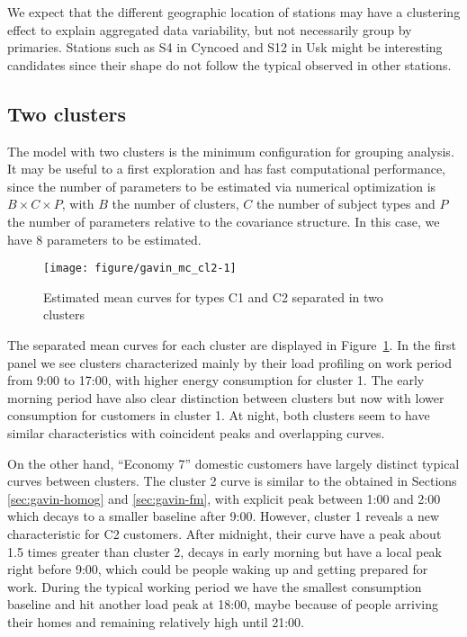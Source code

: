 We expect that the different geographic location of stations may have a clustering effect to explain aggregated data variability, but not necessarily group by primaries. Stations such as S4 in Cyncoed and S12 in Usk might be interesting candidates since their shape do not follow the typical observed in other stations.


\subsection{Two clusters}
\label{sec:gavin-2cl}





The model with two clusters is the minimum configuration for grouping analysis. It may be useful to a first exploration and has fast computational performance, since the number of parameters to be estimated via numerical optimization is $B \times C \times P$, with $B$ the number of clusters, $C$ the number of subject types and $P$ the number of parameters relative to the covariance structure. In this case, we have 8 parameters to be estimated.



\begin{figure}[t]
  \centering
\begin{knitrout}
\color{fgcolor}
\texttt{[image: figure/gavin\_mc\_cl2-1]} 

\end{knitrout}
  \caption{Estimated mean curves for types C1 and C2 separated in two clusters}
  \label{fig:gavin-cl2-mc}
\end{figure}

The separated mean curves for each cluster are displayed in Figure~\ref{fig:gavin-cl2-mc}. In the first panel we see clusters characterized mainly by their load profiling on work period from 9:00 to 17:00, with higher energy consumption for cluster 1. The early morning period have also clear distinction between clusters but now with  lower consumption for customers in cluster 1. At night, both clusters seem to have similar characteristics with coincident peaks and overlapping curves.

On the other hand, ``Economy 7'' domestic customers have largely distinct typical curves between clusters. The cluster 2 curve is similar to the obtained in Sections \ref{sec:gavin-homog} and \ref{sec:gavin-fm}, with explicit peak between 1:00 and 2:00 which decays to a smaller baseline after 9:00. However, cluster 1 reveals a new characteristic for C2 customers. After midnight, their curve have a peak about 1.5 times greater than cluster 2, decays in early morning but have a local peak right before 9:00, which could be people waking up and getting prepared for work. During the typical working period we have the smallest consumption baseline and hit another load peak at 18:00, maybe because of people arriving their homes and remaining relatively high until 21:00.

